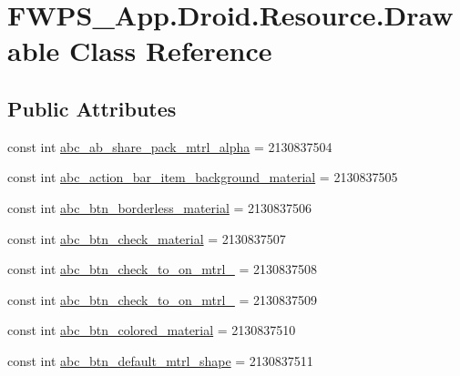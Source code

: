 \hypertarget{class_f_w_p_s___app_1_1_droid_1_1_resource_1_1_drawable}{}\section{F\+W\+P\+S\+\_\+\+App.\+Droid.\+Resource.\+Drawable Class Reference}
\label{class_f_w_p_s___app_1_1_droid_1_1_resource_1_1_drawable}
\subsection*{Public Attributes}
\begin{DoxyCompactItemize}
\item 
const int \mbox{\hyperlink{class_f_w_p_s___app_1_1_droid_1_1_resource_1_1_drawable_adac7a73f722211249bd12016b7127b77}{abc\+\_\+ab\+\_\+share\+\_\+pack\+\_\+mtrl\+\_\+alpha}} = 2130837504
\item 
const int \mbox{\hyperlink{class_f_w_p_s___app_1_1_droid_1_1_resource_1_1_drawable_a1d1c8a4e5b4d85eef5dfca361e0416df}{abc\+\_\+action\+\_\+bar\+\_\+item\+\_\+background\+\_\+material}} = 2130837505
\item 
const int \mbox{\hyperlink{class_f_w_p_s___app_1_1_droid_1_1_resource_1_1_drawable_a5244b5c16e2d829479e8037935bf15d6}{abc\+\_\+btn\+\_\+borderless\+\_\+material}} = 2130837506
\item 
const int \mbox{\hyperlink{class_f_w_p_s___app_1_1_droid_1_1_resource_1_1_drawable_ad2938c293e0a3f06cb4038ffb17572ab}{abc\+\_\+btn\+\_\+check\+\_\+material}} = 2130837507
\item 
const int \mbox{\hyperlink{class_f_w_p_s___app_1_1_droid_1_1_resource_1_1_drawable_aa64607743519f2974bb147a984c59c61}{abc\+\_\+btn\+\_\+check\+\_\+to\+\_\+on\+\_\+mtrl\+\_}} = 2130837508
\item 
const int \mbox{\hyperlink{class_f_w_p_s___app_1_1_droid_1_1_resource_1_1_drawable_ae3cbc043720d51e770d8dd70accf5e24}{abc\+\_\+btn\+\_\+check\+\_\+to\+\_\+on\+\_\+mtrl\+\_}} = 2130837509
\item 
const int \mbox{\hyperlink{class_f_w_p_s___app_1_1_droid_1_1_resource_1_1_drawable_a5c9277d89f616f6eff2aae0e5e20c8ef}{abc\+\_\+btn\+\_\+colored\+\_\+material}} = 2130837510
\item 
const int \mbox{\hyperlink{class_f_w_p_s___app_1_1_droid_1_1_resource_1_1_drawable_ae8634d5122a588be12500342d2c0c1f2}{abc\+\_\+btn\+\_\+default\+\_\+mtrl\+\_\+shape}} = 2130837511
\item 

\end{DoxyCompactItemize}
